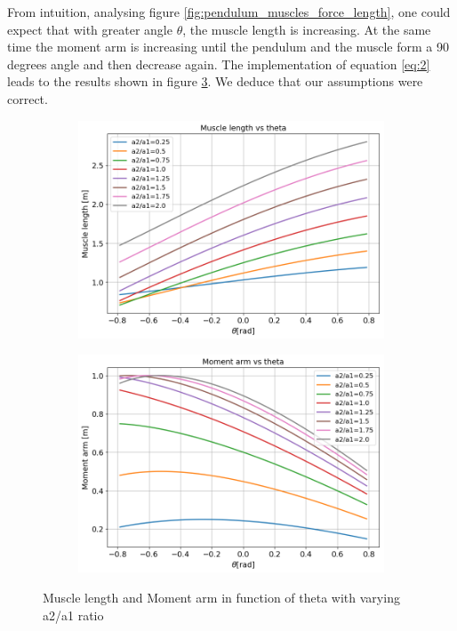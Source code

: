 \documentclass{cmc}
\begin{document}
From intuition, analysing figure \ref{fig:pendulum_muscles_force_length}, one could expect that with greater angle $\theta$, the muscle length is increasing. At the same time the moment arm is increasing until the pendulum and the muscle form a 90 degrees angle and then decrease again. The implementation of equation \ref{eq:2} leads to the results shown in figure \ref{fig:2a_plots}. We deduce that our assumptions were correct.
\begin{figure}[H]
  \centering
  \begin{subfigure}[b]{0.49\textwidth}
    { \centering
      \includegraphics[width=\textwidth]{figures/2_a_muscle_length.png} }

    \label{fig:2a_muscle_length}
  \end{subfigure}
  \begin{subfigure}[b]{0.49\textwidth}
    { \centering
      \includegraphics[width=\textwidth]{figures/2_a_moment_arm.png} }

    \label{fig:2a_moment_arm}
  \end{subfigure}
  \caption{Muscle length and Moment arm in function of theta with varying a2/a1 ratio}
  \label{fig:2a_plots}
\end{figure}
\end{document}
